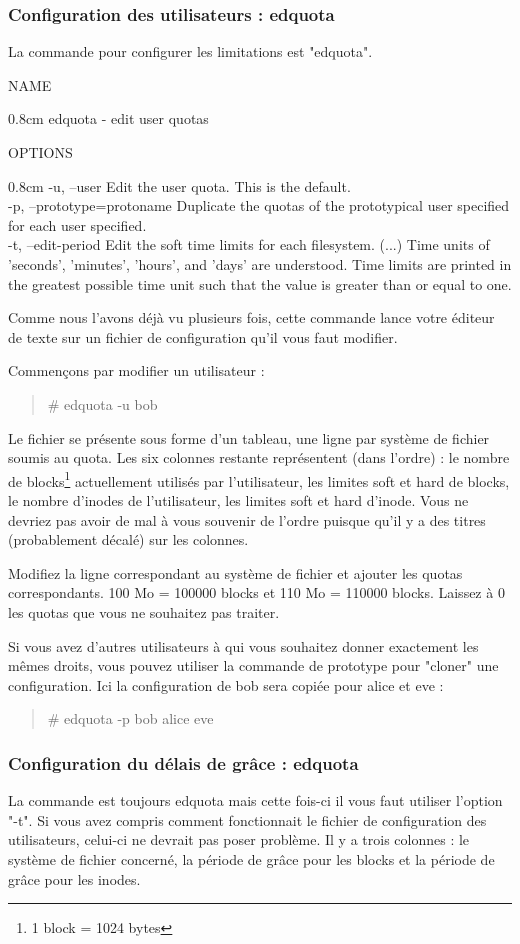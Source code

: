 \documentclass[a4paper]{article}
\newcommand{\commande}[1] {
    \begin{quote}
    \tt\raggedright #1 
    \end{quote}
}
\newcommand{\man}[2]{
    \begin{tcolorbox}[toprule=3mm,width=\textwidth,outer arc=0mm,colbacktitle=grayman,coltitle=black,colback={grayman},colframe={grayman},title={man : \tt #1}]
        \tt\raggedright #2
    \end{tcolorbox}
}
\newcommand{\mandesc}[1]{
    \begin{adjustwidth}{0.8cm}{}
        #1
    \end{adjustwidth}
}
\begin{document}
\subsubsection{Configuration des utilisateurs : edquota}
\par La commande pour configurer les limitations est "edquota".
\man{edquota}{NAME
\mandesc{edquota - edit user quotas}
OPTIONS
\mandesc{-u, --user Edit the user quota. This is the default.\\
-p, --prototype=protoname Duplicate the quotas of the prototypical user specified for each user specified.\\
-t, --edit-period
              Edit  the  soft time limits for each filesystem.  (...) Time units of 'seconds', 'minutes', 'hours', and 'days' are understood. Time limits are printed in the greatest possible  time  unit  such that the value is greater than or equal to one.
}}
\par Comme nous l'avons déjà vu plusieurs fois, cette commande lance votre éditeur de texte sur un fichier de configuration qu'il vous faut modifier.
\par Commençons par modifier un utilisateur :
\commande{\# edquota -u bob}
\par Le fichier se présente sous forme d'un tableau, une ligne par système de fichier soumis au quota. Les six colonnes restante représentent (dans l'ordre) : le nombre de blocks\footnote{1 block = 1024 bytes} actuellement utilisés par l'utilisateur, les limites soft et hard de blocks, le nombre d'inodes de l'utilisateur, les limites soft et hard d'inode. Vous ne devriez pas avoir de mal à vous souvenir de l'ordre puisque qu'il y a des titres (probablement décalé) sur les colonnes.
\par Modifiez la ligne correspondant au système de fichier et ajouter les quotas correspondants. 100 Mo = 100000 blocks et 110 Mo = 110000 blocks. Laissez à 0 les quotas que vous ne souhaitez pas traiter.
\par Si vous avez d'autres utilisateurs à qui vous souhaitez donner exactement les mêmes droits, vous pouvez utiliser la commande de prototype pour "cloner" une configuration. Ici la configuration de bob sera copiée pour alice et eve :
\commande{\# edquota -p bob alice eve}

\subsubsection{Configuration du délais de grâce : edquota}
\par La commande est toujours edquota mais cette fois-ci il vous faut utiliser l'option "-t". Si vous avez compris comment fonctionnait le fichier de configuration des utilisateurs, celui-ci ne devrait pas poser problème. Il y a trois colonnes : le système de fichier concerné, la période de grâce pour les blocks et la période de grâce pour les inodes.
\end{document}
